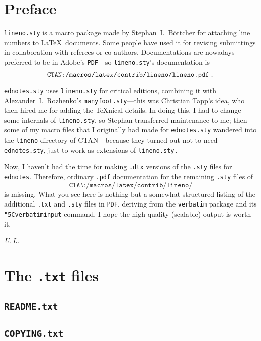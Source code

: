 \documentclass[10pt]{article}
\newcommand*{\cs}[1]{\texttt{\char"5C#1}}
\newcommand*{\lcurl}[1]{\[\texttt{CTAN:/macros/latex/contrib/#1}\]}
\begin{document}
\maketitle
\section*{Preface}

\texttt{lineno.sty} is a macro package made by 
Stephan~I.~B\"ottcher for attaching line numbers to 
\LaTeX\ documents. Some people have used it for revising 
submittings in collaboration with referees or co-authors. 
Documentations are nowadays preferred to be in 
Adobe's \texttt{PDF}---so \texttt{lineno.sty}'s 
documentation is \lcurl{lineno/lineno.pdf\,.}

\texttt{ednotes.sty} uses \texttt{lineno.sty} for critical 
editions, combining it with Alexander~I.~Rozhenko's 
\texttt{manyfoot.sty}---this was Christian Tapp's idea, 
who then hired me for adding the \TeX nical details. 
In doing this, I had to change some internals of 
\texttt{lineno.sty}, so Stephan transferred maintenance 
to me; then some of my macro files that I originally had 
made for \texttt{ednotes.sty} wandered into the 
\texttt{lineno} directory of CTAN---because they turned 
out not to need \texttt{ednotes.sty}, 
just to work as extensions of \texttt{lineno.sty}\,. 

Now, I haven't had the time for making \texttt{.dtx} versions 
of the \texttt{.sty} files for \texttt{ednotes}. 
Therefore, ordinary \texttt{.pdf} documentation for 
the remaining \texttt{.sty} files of \lcurl{lineno/}
is missing. 
What you see here is nothing but a somewhat structured listing 
of the additional \texttt{.txt} and \texttt{.sty} files in 
\texttt{PDF}, deriving from the \texttt{verbatim} package and 
its \cs{verbatiminput} command. I hope the high quality 
(scalable) output is worth it. 

\leavevmode\hfill \textit{U.\,L.}

\newpage 
\tableofcontents
 
\section{The \texttt{.txt} files}
\subsection{\texttt{README.txt}}

\subsection{\texttt{COPYING.txt}}

\end{document}
